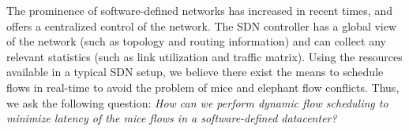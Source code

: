 The prominence of software-defined networks has increased in recent times, and offers a centralized control of the network. The SDN controller has a global view of the network (such as topology and routing information) and can collect any relevant statistics (such as link utilization and traffic matrix). Using the resources available in a typical SDN setup, we believe there exist the means to schedule flows in real-time to avoid the problem of mice and elephant flow conflicts. Thus, we ask the following question: \emph{How can we perform dynamic flow scheduling to minimize latency of the mice flows in a software-defined datacenter? }  
